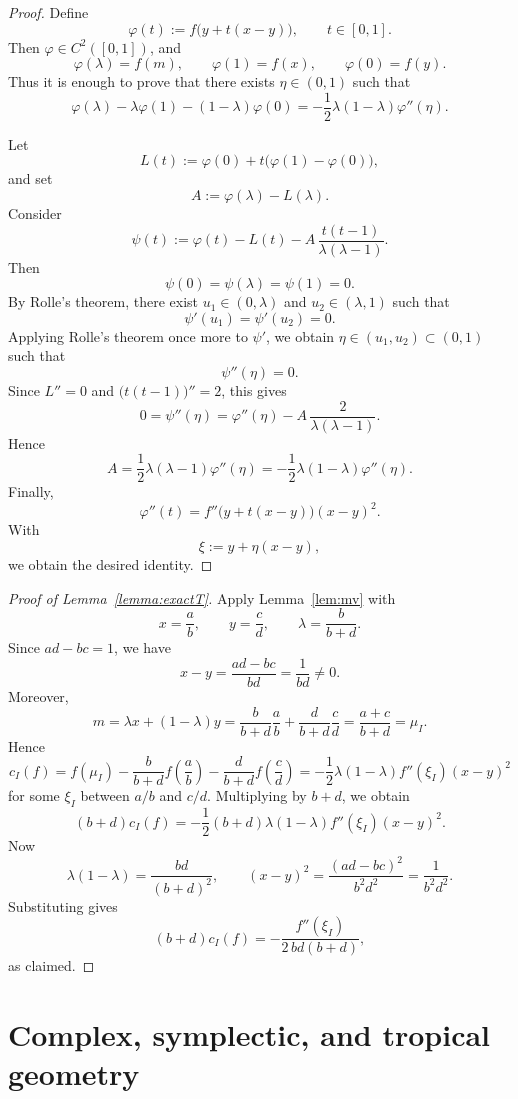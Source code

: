 \documentclass[a4paper,american,11pt]{amsart}
\theoremstyle{plain}
\theoremstyle{definition}
\begin{document}
\begin{proof}
Define
\[
\varphi(t):=f\bigl(y+t(x-y)\bigr),
\qquad t\in[0,1].
\]
Then \(\varphi\in C^2([0,1])\), and
\[
\varphi(\lambda)=f(m),
\qquad
\varphi(1)=f(x),
\qquad
\varphi(0)=f(y).
\]
Thus it is enough to prove that there exists \(\eta\in(0,1)\) such that
\[
\varphi(\lambda)-\lambda\varphi(1)-(1-\lambda)\varphi(0)
=
-\frac12\lambda(1-\lambda)\varphi''(\eta).
\]

Let
\[
L(t):=\varphi(0)+t\bigl(\varphi(1)-\varphi(0)\bigr),
\]
and set
\[
A:=\varphi(\lambda)-L(\lambda).
\]
Consider
\[
\psi(t)
:=
\varphi(t)-L(t)
-
A\,\frac{t(t-1)}{\lambda(\lambda-1)}.
\]
Then
\[
\psi(0)=\psi(\lambda)=\psi(1)=0.
\]
By Rolle's theorem, there exist \(u_1\in(0,\lambda)\) and
\(u_2\in(\lambda,1)\) such that
\[
\psi'(u_1)=\psi'(u_2)=0.
\]
Applying Rolle's theorem once more to \(\psi'\), we obtain
\(\eta\in(u_1,u_2)\subset(0,1)\) such that
\[
\psi''(\eta)=0.
\]
Since \(L''=0\) and \(\bigl(t(t-1)\bigr)''=2\), this gives
\[
0
=
\psi''(\eta)
=
\varphi''(\eta)-A\,\frac{2}{\lambda(\lambda-1)}.
\]
Hence
\[
A
=
\frac12\lambda(\lambda-1)\varphi''(\eta)
=
-\frac12\lambda(1-\lambda)\varphi''(\eta).
\]
Finally,
\[
\varphi''(t)
=
f''\bigl(y+t(x-y)\bigr)(x-y)^2.
\]
With
\[
\xi:=y+\eta(x-y),
\]
we obtain the desired identity.
\end{proof}

\begin{proof}[Proof of Lemma~\ref{lemma:exactT}]\label{proof:lemma:exactT}
Apply Lemma~\ref{lem:mv} with
\[
x=\frac ab,
\qquad
y=\frac cd,
\qquad
\lambda=\frac{b}{b+d}.
\]
Since \(ad-bc=1\), we have
\[
x-y=\frac{ad-bc}{bd}=\frac1{bd}\neq0.
\]
Moreover,
\[
m
=
\lambda x+(1-\lambda)y
=
\frac{b}{b+d}\frac ab
+
\frac{d}{b+d}\frac cd
=
\frac{a+c}{b+d}
=
\mu_I.
\]
Hence
\[
c_I(f)
=
f(\mu_I)
-
\frac{b}{b+d}f\!\left(\frac ab\right)
-
\frac{d}{b+d}f\!\left(\frac cd\right)
=
-\frac12\lambda(1-\lambda)f''(\xi_I)(x-y)^2
\]
for some \(\xi_I\) between \(a/b\) and \(c/d\). Multiplying by \(b+d\), we
obtain
\[
(b+d)c_I(f)
=
-\frac12(b+d)\lambda(1-\lambda)f''(\xi_I)(x-y)^2.
\]
Now
\[
\lambda(1-\lambda)=\frac{bd}{(b+d)^2},
\qquad
(x-y)^2=\frac{(ad-bc)^2}{b^2d^2}=\frac1{b^2d^2}.
\]
Substituting gives
\[
(b+d)c_I(f)
=
-\frac{f''(\xi_I)}{2\,bd(b+d)},
\]
as claimed.
\end{proof}

\section{Complex, symplectic, and tropical geometry}\label{app2}
\end{document}

